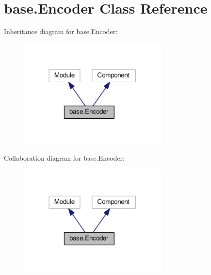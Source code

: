 \hypertarget{classbase_1_1Encoder}{}\section{base.\+Encoder Class Reference}
\label{classbase_1_1Encoder}


Inheritance diagram for base.\+Encoder\+:
\nopagebreak
\begin{figure}[H]
\begin{center}
\leavevmode
\includegraphics[width=214pt]{classbase_1_1Encoder__inherit__graph}
\end{center}
\end{figure}


Collaboration diagram for base.\+Encoder\+:
\nopagebreak
\begin{figure}[H]
\begin{center}
\leavevmode
\includegraphics[width=214pt]{classbase_1_1Encoder__coll__graph}
\end{center}
\end{figure}
